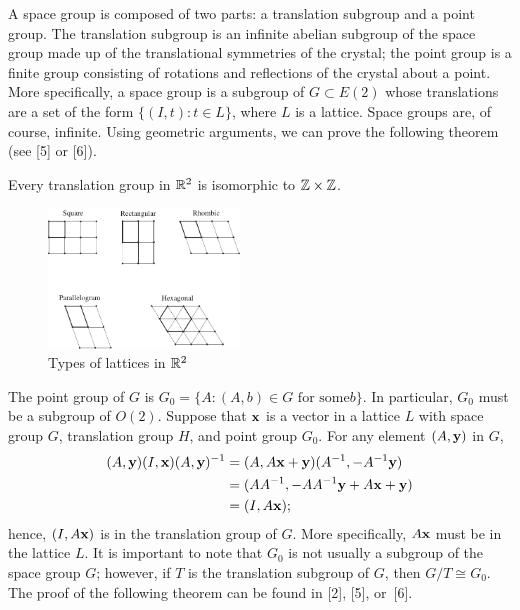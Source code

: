  
A space group is composed of two parts: a {\bfi translation
subgroup\/} and a {\bfi point
group}.  The translation subgroup is an infinite
abelian subgroup of the space group made up of the translational
symmetries of the crystal; the point group is a finite group 
consisting  of rotations and reflections of the crystal about a point.
More specifically, a space group is a subgroup of $G \subset E(2)$
whose translations are a set of the form $\{ (I, t) : t \in L \}$,
where $L$ is a lattice. Space groups are, of course, infinite. Using
geometric arguments, we can prove the following theorem (see [5] or [6]).
 
 
 
 
\begin{theorem}
Every translation group in ${\Bbb R}^2$ is isomorphic to ${\Bbb Z}
\times {\Bbb Z}$.
\end{theorem}
 
 
\begin{figure}[bht]
\begin{center}
\centerline {
\includegraphics[width=2in]{TypeLattice}
}
\end{center}
\caption{Types of lattices in  ${\Bbb R}^2$}
\label{Types}
\end{figure}
 
 
The point group of $G$ is $G_0 = \{A : (A,b) \in G \mbox{ for some
$b$}  \}$. In particular, $G_0$ must be a subgroup of $O(2)$. Suppose
that ${\bold x}$ is a vector in a lattice $L$ with space group $G$,
translation group $H$, and point group $G_0$. For any element $(A,
{\bold y})$ in $G$,   
\begin{align*}
(A, {\bold y}) (I, {\bold x}) (A, {\bold y})^{-1}
& =
(A,A {\bold x} + {\bold y}) (A^{-1},-A^{-1} {\bold y}) \\
& =
(A A^{-1},-A A^{-1} {\bold y} + A {\bold x} + {\bold y}) \\
& =
(I, A {\bold x});
\end{align*}
hence, $(I, A {\bold x})$ is in the translation group of $G$. More
specifically, $A {\bold x}$ must be in the lattice $L$. It is
important to note that $G_0$ is not usually a subgroup of the space
group $G$; however, if $T$ is the translation subgroup of $G$, then
$G/T \cong G_0$. The proof of the following theorem can be found in
[2], [5], or~[6].
 
